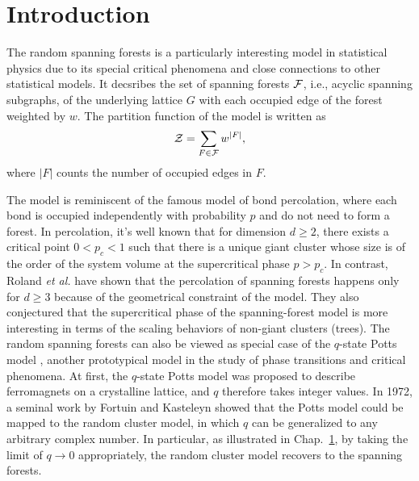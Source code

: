 \chapter{Introduction}

The random spanning forests is a particularly interesting model in statistical physics due to its special critical phenomena
and close connections to other statistical models. It decsribes the set of spanning forests ${\mathcal F}$, i.e., acyclic spanning subgraphs, of the underlying
lattice $G$ with each occupied edge of the forest weighted by $w$. The partition function of the model is written as
\begin{equation}\label{eq:SPF_partition}
	{\mathcal Z} = \sum_{F \in {\mathcal F}} w^{|F|},
\end{equation}
where $|F|$ counts the number of occupied edges in $F$.

The model is reminiscent of the famous model of bond percolation, where each bond is occupied independently with probability $p$ and do not need to form a forest.
In percolation, it's well known that for dimension $d \geq 2$, there exists a critical point $0 < p_c < 1$ such that there is a unique giant cluster whose size is of the order of the system volume
at the supercritical phase $p > p_c$. In contrast, Roland \textit{et al.} \cite{Roland2021Percolation} have shown that the percolation of spanning forests happens only for $d \geq 3$ 
because of the geometrical constraint of the model. They also conjectured that the supercritical phase of the spanning-forest model is more interesting in terms of the scaling behaviors of non-giant clusters (trees). 
The random spanning forests can also be viewed as special case of the $q$-state Potts model \cite{Potts1952, Wu1982}, another prototypical model in the study of phase transitions and critical phenomena.
At first, the $q$-state Potts model was proposed to describe ferromagnets on a crystalline lattice, and $q$ therefore takes integer values.
In 1972, a seminal work by Fortuin and Kasteleyn \cite{Fortuin1972} showed that the Potts model could be mapped to the random cluster model, in which $q$ can be 
generalized to any arbitrary complex number. In particular, as illustrated in Chap.~\ref{}, by taking the limit of $q\to 0$ appropriately,
the random cluster model recovers to the spanning forests.

